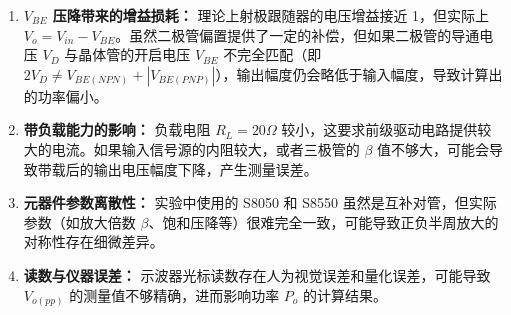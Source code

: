 \documentclass[UTF8, a4paper]{ctexrep} %
\begin{document}
\begin{enumerate}
    \item \textbf{ $V_{BE}$ 压降带来的增益损耗：}
    理论上射极跟随器的电压增益接近 1，但实际上 $V_o = V_{in} - V_{BE}$。虽然二极管偏置提供了一定的补偿，但如果二极管的导通电压 $V_D$ 与晶体管的开启电压 $V_{BE}$ 不完全匹配（即 $2V_D \neq V_{BE(NPN)} + |V_{BE(PNP)}|$），输出幅度仍会略低于输入幅度，导致计算出的功率偏小。
    
    \item \textbf{带负载能力的影响：}
    负载电阻 $R_L = 20\Omega$ 较小，这要求前级驱动电路提供较大的电流。如果输入信号源的内阻较大，或者三极管的 $\beta$ 值不够大，可能会导致带载后的输出电压幅度下降，产生测量误差。
    
    \item \textbf{元器件参数离散性：}
    实验中使用的 S8050 和 S8550 虽然是互补对管，但实际参数（如放大倍数 $\beta$、饱和压降等）很难完全一致，可能导致正负半周放大的对称性存在细微差异。
    
    \item \textbf{读数与仪器误差：}
    示波器光标读数存在人为视觉误差和量化误差，可能导致 $V_{o(pp)}$ 的测量值不够精确，进而影响功率 $P_o$ 的计算结果。
\end{enumerate}
\end{document}
